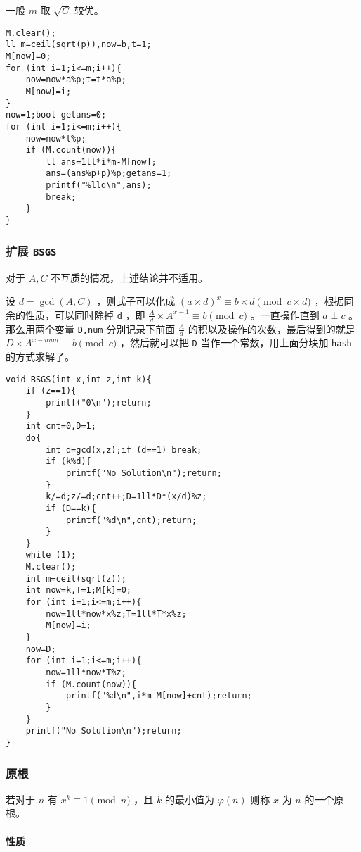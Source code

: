 \documentclass[UTF-8]{ctexart}
\begin{document}
	一般 $m$ 取 $\sqrt{C}$ 较优。
	
\begin{verbatim}
M.clear();
ll m=ceil(sqrt(p)),now=b,t=1;
M[now]=0;
for (int i=1;i<=m;i++){
    now=now*a%p;t=t*a%p;
    M[now]=i;
}
now=1;bool getans=0;
for (int i=1;i<=m;i++){
    now=now*t%p;
    if (M.count(now)){
        ll ans=1ll*i*m-M[now];
        ans=(ans%p+p)%p;getans=1;
        printf("%lld\n",ans);
        break;
    }
}
\end{verbatim}
	\subsubsection{扩展 \texttt{BSGS}}
	对于 $A,C$ 不互质的情况，上述结论并不适用。
	
	设 $d=\gcd(A,C)$ ，则式子可以化成 $(a \times d)^x \equiv b \times d \pmod {c \times d}$ ，根据同余的性质，可以同时除掉 \texttt{d} ，即 $\frac{A}{d} \times A^{x-1} \equiv b \pmod c$ 。一直操作直到 $a \perp c$ 。那么用两个变量 \texttt{D,num} 分别记录下前面 $\frac{A}{d}$ 的积以及操作的次数，最后得到的就是 $D \times A^{x-num} \equiv b \pmod c$ ，然后就可以把 \texttt{D} 当作一个常数，用上面分块加 \texttt{hash} 的方式求解了。
\begin{verbatim}
void BSGS(int x,int z,int k){
    if (z==1){
        printf("0\n");return;
    }
    int cnt=0,D=1;
    do{
        int d=gcd(x,z);if (d==1) break;
        if (k%d){
            printf("No Solution\n");return;
        }
        k/=d;z/=d;cnt++;D=1ll*D*(x/d)%z;
        if (D==k){
            printf("%d\n",cnt);return;
        }
    }
    while (1);
    M.clear();
    int m=ceil(sqrt(z));
    int now=k,T=1;M[k]=0;
    for (int i=1;i<=m;i++){
        now=1ll*now*x%z;T=1ll*T*x%z;
        M[now]=i;
    }
    now=D;
    for (int i=1;i<=m;i++){
        now=1ll*now*T%z;
        if (M.count(now)){
            printf("%d\n",i*m-M[now]+cnt);return;
        }
    }
    printf("No Solution\n");return;
}
\end{verbatim}
	\subsubsection{原根}
	若对于 $n$ 有 $x ^ k \equiv 1 \pmod n$ ，且 $k$ 的最小值为 $\varphi(n)$ 则称 $x$ 为 $n$ 的一个原根。
	
	\paragraph{性质}
	
\end{document}
